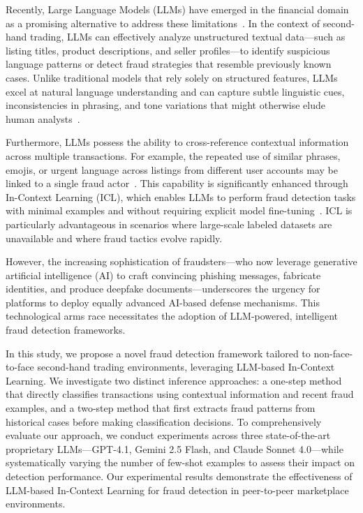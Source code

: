 \documentclass[sigconf]{acmart}
\begin{document}
Recently, Large Language Models (LLMs) have emerged in the financial domain as a promising alternative to address these limitations~\cite{huang2024ptp,huang2023,lee2025}. In the context of second-hand trading, LLMs can effectively analyze unstructured textual data—such as listing titles, product descriptions, and seller profiles—to identify suspicious language patterns or detect fraud strategies that resemble previously known cases. Unlike traditional models that rely solely on structured features, LLMs excel at natural language understanding and can capture subtle linguistic cues, inconsistencies in phrasing, and tone variations that might otherwise elude human analysts~\cite{cahyawijaya2024,wu2025why,agarwal2024}.

Furthermore, LLMs possess the ability to cross-reference contextual information across multiple transactions. For example, the repeated use of similar phrases, emojis, or urgent language across listings from different user accounts may be linked to a single fraud actor~\cite{pan2020}. This capability is significantly enhanced through In-Context Learning (ICL), which enables LLMs to perform fraud detection tasks with minimal examples and without requiring explicit model fine-tuning~\cite{zhao2024fewshing}. ICL is particularly advantageous in scenarios where large-scale labeled datasets are unavailable and where fraud tactics evolve rapidly.

However, the increasing sophistication of fraudsters—who now leverage generative artificial intelligence (AI) to craft convincing phishing messages, fabricate identities, and produce deepfake documents—underscores the urgency for platforms to deploy equally advanced AI-based defense mechanisms. This technological arms race necessitates the adoption of LLM-powered, intelligent fraud detection frameworks.

In this study, we propose a novel fraud detection framework tailored to non-face-to-face second-hand trading environments, leveraging LLM-based In-Context Learning. We investigate two distinct inference approaches: a one-step method that directly classifies transactions using contextual information and recent fraud examples, and a two-step method that first extracts fraud patterns from historical cases before making classification decisions. To comprehensively evaluate our approach, we conduct experiments across three state-of-the-art proprietary LLMs—GPT-4.1, Gemini 2.5 Flash, and Claude Sonnet 4.0—while systematically varying the number of few-shot examples to assess their impact on detection performance. Our experimental results demonstrate the effectiveness of LLM-based In-Context Learning for fraud detection in peer-to-peer marketplace environments.
\end{document}
